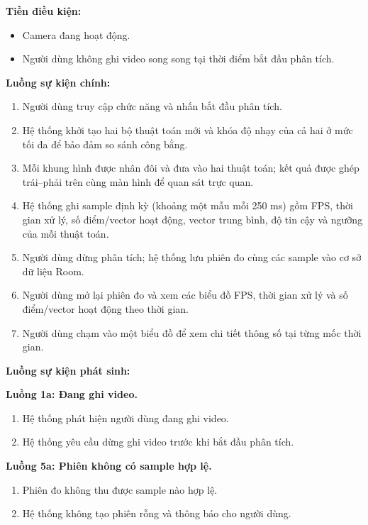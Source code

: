 \documentclass[../DoAn.tex]{subfiles}
\begin{document}
\textbf{Tiền điều kiện:}
\begin{itemize}
    \item Camera đang hoạt động.
    \item Người dùng không ghi video song song tại thời điểm bắt đầu phân tích.
\end{itemize}

\textbf{Luồng sự kiện chính:}
\begin{enumerate}
    \item Người dùng truy cập chức năng và nhấn bắt đầu phân tích.
    \item Hệ thống khởi tạo hai bộ thuật toán mới và khóa độ nhạy của cả hai ở mức tối đa để bảo đảm so sánh công bằng.
    \item Mỗi khung hình được nhân đôi và đưa vào hai thuật toán; kết quả được ghép trái--phải trên cùng màn hình để quan sát trực quan.
    \item Hệ thống ghi sample định kỳ (khoảng một mẫu mỗi 250 ms) gồm FPS, thời gian xử lý, số điểm/vector hoạt động, vector trung bình, độ tin cậy và ngưỡng của mỗi thuật toán.
    \item Người dùng dừng phân tích; hệ thống lưu phiên đo cùng các sample vào cơ sở dữ liệu Room.
    \item Người dùng mở lại phiên đo và xem các biểu đồ FPS, thời gian xử lý và số điểm/vector hoạt động theo thời gian.
    \item Người dùng chạm vào một biểu đồ để xem chi tiết thông số tại từng mốc thời gian.
\end{enumerate}

\textbf{Luồng sự kiện phát sinh:}

\textbf{Luồng 1a: Đang ghi video.}
\begin{enumerate}[label=1a.\arabic*., leftmargin=2.6em, align=left, labelsep=0.5em]
    \item Hệ thống phát hiện người dùng đang ghi video.
    \item Hệ thống yêu cầu dừng ghi video trước khi bắt đầu phân tích.
\end{enumerate}

\textbf{Luồng 5a: Phiên không có sample hợp lệ.}
\begin{enumerate}[label=5a.\arabic*., leftmargin=2.6em, align=left, labelsep=0.5em]
    \item Phiên đo không thu được sample nào hợp lệ.
    \item Hệ thống không tạo phiên rỗng và thông báo cho người dùng.
\end{enumerate}
\end{document}
